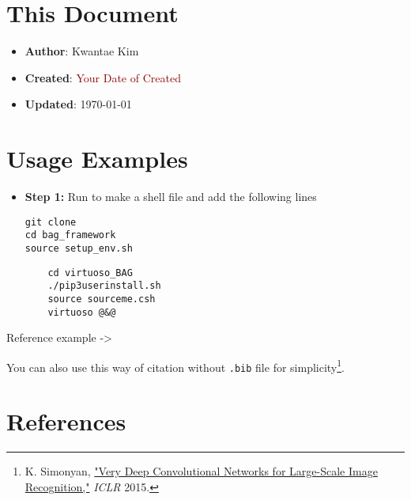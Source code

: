 \documentclass[a4paper,12pt]{article}
\begin{document}
\section*{This Document}

\begin{itemize}
    \item \textbf{Author}: Kwantae Kim
    \item \textbf{Created}: \textcolor{darkred}{Your Date of Created}
    \item \textbf{Updated}: \today
\end{itemize}

\tableofcontents

\pagebreak


\section{Usage Examples}

\begin{itemize}
    \item[\footnotesize\faCode] \textbf{Step 1:} Run  to make a shell file and add the following lines
          \vspace{-1em}\begin{verbatim}
git clone
cd bag_framework
source setup_env.sh
        \end{verbatim}
          \vspace{-1em}\begin{verbatim}
    cd virtuoso_BAG
    ./pip3userinstall.sh
    source sourceme.csh
    virtuoso @&@
        \end{verbatim}
\end{itemize}

Reference example -> \cite{razavi2017design}

You can also use this way of citation without \texttt{.bib} file for simplicity\footnote{K. Simonyan, \href{https://arxiv.org/abs/1409.1556}{"Very Deep Convolutional Networks for Large-Scale Image Recognition,"} \textit{ICLR} 2015.}.

\pagebreak
\section{References}
\printbibliography[heading=none]
\label{lastpage}        %
\end{document}
